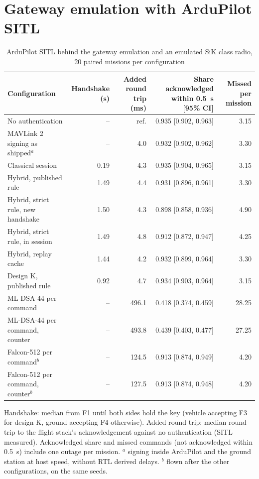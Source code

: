 \documentclass[conference]{IEEEtran}
\begin{document}
\section{Gateway emulation with ArduPilot SITL}
\label{sec:sitl}
\begin{table}[t]
\centering
\caption{ArduPilot SITL behind the gateway emulation and an emulated SiK class radio, 20 paired missions per configuration}
\label{tab:sitl}
\setlength{\tabcolsep}{3pt}
\begin{tabular}{lrrrr}
\toprule
Configuration & Handshake (s) & Added round trip (ms) & Share acknowledged within 0.5~s [95\% CI] & Missed per mission \\
\midrule
No authentication & -- & ref. & 0.935 [0.902, 0.963] & 3.15 \\
MAVLink 2 signing as shipped$^{a}$ & -- & 4.0 & 0.932 [0.902, 0.962] & 3.30 \\
Classical session & 0.19 & 4.3 & 0.935 [0.904, 0.965] & 3.15 \\
Hybrid, published rule & 1.49 & 4.4 & 0.931 [0.896, 0.961] & 3.30 \\
Hybrid, strict rule, new handshake & 1.50 & 4.3 & 0.898 [0.858, 0.936] & 4.90 \\
Hybrid, strict rule, in session & 1.49 & 4.8 & 0.912 [0.872, 0.947] & 4.25 \\
Hybrid, replay cache & 1.44 & 4.2 & 0.932 [0.899, 0.964] & 3.30 \\
Design K, published rule & 0.92 & 4.7 & 0.934 [0.903, 0.964] & 3.15 \\
ML-DSA-44 per command & -- & 496.1 & 0.418 [0.374, 0.459] & 28.25 \\
ML-DSA-44 per command, counter & -- & 493.8 & 0.439 [0.403, 0.477] & 27.25 \\
Falcon-512 per command$^{b}$ & -- & 124.5 & 0.913 [0.874, 0.949] & 4.20 \\
Falcon-512 per command, counter$^{b}$ & -- & 127.5 & 0.913 [0.874, 0.948] & 4.20 \\
\bottomrule
\end{tabular}

\smallskip\footnotesize Handshake: median from F1 until both sides hold the key (vehicle accepting F3 for design K, ground accepting F4 otherwise). Added round trip: median round trip to the flight stack's acknowledgement against no authentication (SITL measured). Acknowledged share and missed commands (not acknowledged within 0.5~s) include one outage per mission. $^{a}$ signing inside ArduPilot and the ground station at host speed, without RTL derived delays. $^{b}$ flown after the other configurations, on the same seeds.
\end{table}
\end{document}

